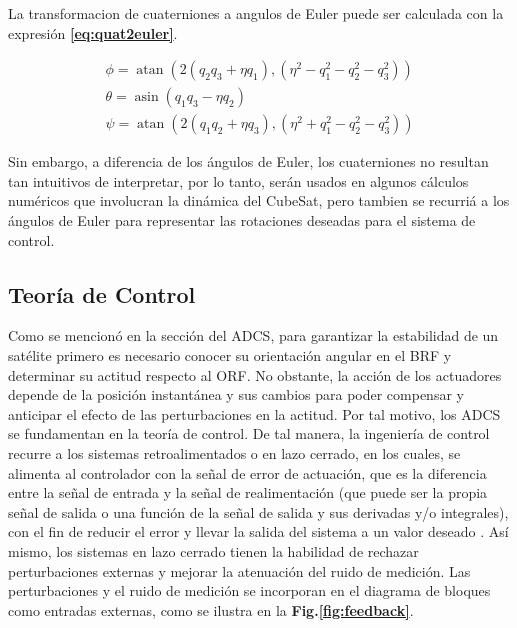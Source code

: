 La transformacion de cuaterniones a angulos de Euler puede ser calculada con la expresión \textbf{\eqref{eq:quat2euler}}.

\begin{equation}
	\begin{gathered}
		\phi=\operatorname{atan}\left(2\left(q_2 q_3+\eta q_1\right),\left(\eta^2-q_1^2-q_2^2-q_3^2\right)\right) \\
		\theta=\operatorname{asin}\left(q_1 q_3-\eta q_2\right) \\
		\psi=\operatorname{atan}\left(2\left(q_1 q_2+\eta q_3\right),\left(\eta^2+q_1^2-q_2^2-q_3^2\right)\right)
	\end{gathered}\label{eq:quat2euler}
\end{equation}

Sin embargo, a diferencia de los ángulos de Euler, los cuaterniones no resultan tan intuitivos de interpretar, por lo tanto, serán usados en algunos cálculos numéricos que involucran la dinámica del CubeSat, pero tambien se recurriá a los ángulos de Euler para representar las rotaciones deseadas para el sistema de control.



\subsection{Teoría de Control}
Como se mencionó en la sección del ADCS, para garantizar la estabilidad de un satélite primero es necesario conocer su orientación angular en el BRF y determinar su actitud respecto al ORF. No obstante, la acción de los actuadores depende de la posición instantánea y sus cambios para poder compensar y anticipar el efecto de las perturbaciones en la actitud. Por tal motivo, los ADCS se fundamentan en la teoría de control.
De tal manera, la ingeniería de control recurre a los sistemas retroalimentados o en lazo cerrado, en los cuales, se alimenta al controlador con la señal de error de actuación, que es la diferencia entre la señal de entrada y la señal de realimentación (que puede ser la propia señal de salida o una función de la señal de salida y sus derivadas y/o integrales), con el fin de reducir el error y llevar la salida del sistema a un valor deseado \cite{ogata2010modern}. 
Así mismo, los sistemas en lazo cerrado tienen la habilidad de rechazar perturbaciones externas y mejorar la atenuación del ruido de medición. Las perturbaciones y el ruido de medición se incorporan en el diagrama de bloques como entradas externas, como se ilustra en la \textbf{Fig.\ref{fig:feedback}}.



